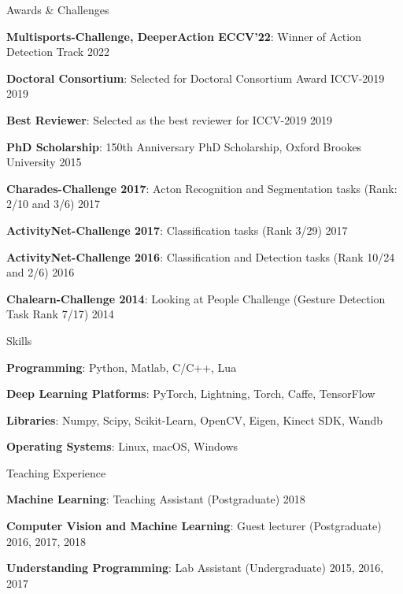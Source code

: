 \documentclass{resume} %
\begin{document}
\vspace{0.1in}
\begin{rSection}{Awards \& Challenges} \itemsep -2pt
\item \textbf{Multisports-Challenge, DeeperAction ECCV'22}: Winner of Action Detection Track \hfill 2022
\item \textbf{Doctoral Consortium}: Selected for Doctoral Consortium Award ICCV-2019 \hfill 2019
\item \textbf{Best Reviewer}: Selected as the best reviewer for ICCV-2019 \hfill 2019
\item \textbf{PhD Scholarship}: 150th Anniversary PhD Scholarship, Oxford Brookes University \hfill 2015
\item \textbf{Charades-Challenge 2017}: Acton Recognition and Segmentation tasks (Rank: 2/10 and 3/6) \hfill 2017
\item \textbf{ActivityNet-Challenge 2017}: Classification tasks (Rank 3/29)  \hfill 2017
\item \textbf{ActivityNet-Challenge 2016}: Classification and Detection tasks (Rank 10/24 and 2/6) \hfill 2016
\item \textbf{Chalearn-Challenge 2014}: Looking at People Challenge (Gesture Detection Task Rank 7/17) \hfill 2014
\end{rSection}

\vspace{0.1in}
\begin{rSection}{Skills} \itemsep -2pt
\item  \textbf{Programming}: Python, Matlab, C/C++, Lua
\item  \textbf{Deep Learning Platforms}: PyTorch, Lightning, Torch, Caffe, TensorFlow
\item  \textbf{Libraries}: Numpy, Scipy, Scikit-Learn, OpenCV, Eigen, Kinect SDK, Wandb
\item  \textbf{Operating Systems}: Linux, macOS, Windows
\end{rSection}

\vspace{0.5in}
\begin{rSection}{Teaching Experience} \itemsep -2pt
  \item  \textbf{Machine Learning}: Teaching Assistant (Postgraduate) \hfill 2018
  \item  \textbf{Computer Vision and Machine Learning}: Guest lecturer (Postgraduate) \hfill 2016, 2017, 2018
  \item  \textbf{Understanding Programming}: Lab Assistant (Undergraduate)  \hfill 2015, 2016, 2017
\end{rSection}
\end{document}
